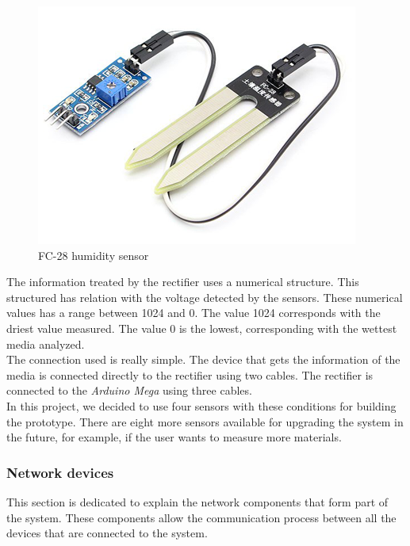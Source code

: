 \begin{figure}[H]
\begin{centering}
\includegraphics[scale=0.8]{IMGS/FC-28.png}
\caption{FC-28 humidity sensor \label{FC28}}
\end{centering}
\end{figure}

The information treated by the rectifier uses a numerical structure. This structured has relation with the voltage detected by the sensors. These numerical values has a range between 1024 and 0. The value 1024 corresponds with the driest value measured. The value 0 is the lowest, corresponding with the wettest media analyzed.\\

The connection used is really simple. The device that gets the information of the media is connected directly to the rectifier using two cables. The rectifier is connected to the \textit{Arduino Mega} using three cables.\\

In this project, we decided to use four sensors with these conditions for building the prototype. There are eight more sensors available for upgrading the system in the future, for example, if the user wants to measure more materials.

\subsubsection{Network devices}

This section is dedicated to explain the network components that form part of the system. These components allow  the communication process between all the devices that are connected to the system.\\ 

